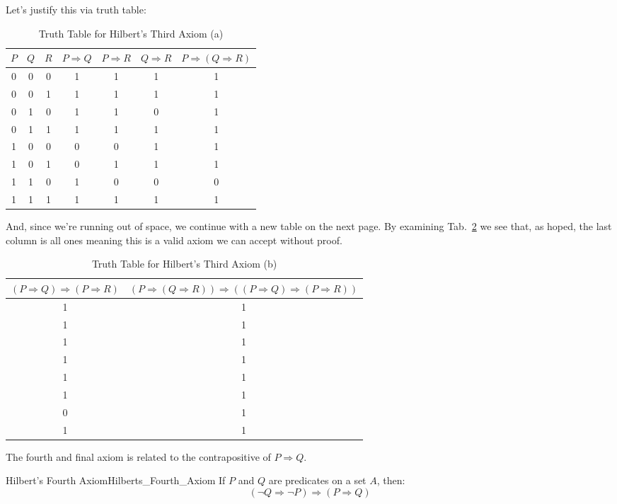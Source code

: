     Let's justify this via truth table:
    \begin{table}[H]
        \centering
        \captionsetup{type=table}
        \begin{tabular}{c|c|c|c|c|c|c}
            $P$&$Q$&$R$&$P\Rightarrow{Q}$&$P\Rightarrow{R}$&$Q\Rightarrow{R}$
                &$P\Rightarrow(Q\Rightarrow{R})$\\
            \hline
            0&0&0&1&1&1&1\\
            0&0&1&1&1&1&1\\
            0&1&0&1&1&0&1\\
            0&1&1&1&1&1&1\\
            1&0&0&0&0&1&1\\
            1&0&1&0&1&1&1\\
            1&1&0&1&0&0&0\\
            1&1&1&1&1&1&1
        \end{tabular}
        \caption{Truth Table for Hilbert's Third Axiom (a)}
        \label{tab:Truth_Table_for_Hilberts_Third_a}
    \end{table}
    And, since we're running out of space, we continue with a new table on the
    next page. By examining Tab.~\ref{tab:Truth_Table_for_Hilberts_Third_b} we
    see that, as hoped, the last column is all ones meaning this is a valid
    axiom we can accept without proof.
    \begin{table}[H]
        \centering
        \captionsetup{type=table}
        \begin{tabular}{c|c}
            $(P\Rightarrow{Q})\Rightarrow(P\Rightarrow{R})$&
            $(P\Rightarrow(Q\Rightarrow{R}))\Rightarrow%
             ((P\Rightarrow{Q})\Rightarrow(P\Rightarrow{R}))$\\
            \hline
            1&1\\
            1&1\\
            1&1\\
            1&1\\
            1&1\\
            1&1\\
            0&1\\
            1&1
        \end{tabular}
        \caption{Truth Table for Hilbert's Third Axiom (b)}
        \label{tab:Truth_Table_for_Hilberts_Third_b}
    \end{table}
    The fourth and final axiom is related to the contrapositive of
    $P\Rightarrow{Q}$.
    \begin{faxiom}{Hilbert's Fourth Axiom}{Hilberts_Fourth_Axiom}
        If $P$ and $Q$ are \glspl{predicate} on a \gls{set} $A$, then:%
        \begin{equation*}
            (\neg{Q}\Rightarrow\neg{P})\Rightarrow(P\Rightarrow{Q})
        \end{equation*}
    \end{faxiom}
